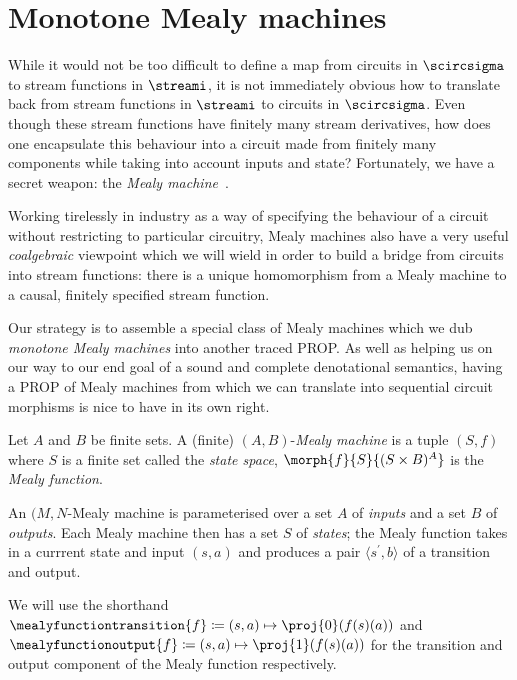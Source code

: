 \section{Monotone Mealy machines}

While it would not be too difficult to define a map from circuits in
\(\scircsigma\) to stream functions in \(\streami\), it is not immediately
obvious how to translate back from stream functions in \(\streami\) to circuits
in \(\scircsigma\).
Even though these stream functions have finitely many stream derivatives, how
does one encapsulate this behaviour into a circuit made from finitely many
components while taking into account inputs and state?
Fortunately, we have a secret weapon: the
\emph{Mealy machine}~\cite{mealy1955method}.

Working tirelessly in industry as a way of specifying the behaviour of a
circuit without restricting to particular circuitry, Mealy machines also have
a very useful \emph{coalgebraic} viewpoint which we will wield in order to
build a bridge from circuits into stream functions: there is a unique
homomorphism from a Mealy machine to a causal, finitely specified stream
function.

Our strategy is to assemble a special class of Mealy machines which we dub
\emph{monotone Mealy machines} into another traced PROP.
As well as helping us on our way to our end goal of a sound and complete
denotational semantics, having a PROP of Mealy machines from which we can
translate into sequential circuit morphisms is nice to have in its own right.

\begin{definition}\label{def:mealy}
    Let \(A\) and \(B\) be finite sets.
    A (finite) \((A,B)\)-\emph{Mealy machine} is a tuple \((S, f)\) where
    \(S\) is a finite set called the \emph{state space},
    \(\morph{f}{S}{(S \times B)^A}\) is the \emph{Mealy function}.
\end{definition}

An \((M,N\)-Mealy machine is parameterised over a set \(A\) of \emph{inputs} and
a set \(B\) of \emph{outputs}.
Each Mealy machine then has a set \(S\) of \emph{states}; the Mealy function
takes in a currrent state and input \((s, a)\) and produces a pair
\(\langle{s^\prime, b}\rangle\) of a transition and output.

\begin{notation}
    We will use the shorthand \(
    \mealyfunctiontransition{f} \coloneqq (s, a) \mapsto \proj{0}(f(s)(a))
    \) and \(
    \mealyfunctionoutput{f} \coloneqq (s, a) \mapsto \proj{1}(f(s)(a))
    \) for the transition and output component of the Mealy function respectively.
\end{notation}

